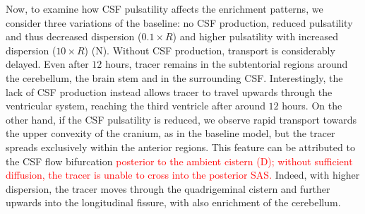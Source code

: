 \documentclass[fleqn,10pt]{wlscirep}
\newcommand{\discuss}[1]{\textcolor{red}{#1}}
\begin{document}
Now, to examine how CSF pulsatility affects the enrichment patterns,
we consider three variations of the baseline: no CSF production,
reduced pulsatility and thus decreased dispersion ($0.1 \times R$) and
higher pulsatility with increased dispersion ($10 \times R$)
(N). Without CSF production, transport is considerably
delayed. Even after $12$ hours, tracer remains in the subtentorial
regions around the cerebellum, the brain stem and in the surrounding
CSF. Interestingly, the lack of CSF production instead allows tracer
to travel upwards through the ventricular system, reaching the third
ventricle after around $12$ hours. On the other hand, if the CSF
pulsatility is reduced, we observe rapid transport towards the upper
convexity of the cranium, as in the baseline model, but the tracer
spreads exclusively within the anterior regions. This feature can be
attributed to the CSF flow bifurcation \discuss{posterior to the
  ambient cistern (D); without sufficient diffusion, the
  tracer is unable to cross into the posterior SAS.} Indeed, with
higher dispersion, the tracer moves through the quadrigeminal cistern
and further upwards into the longitudinal fissure, with also
enrichment of the cerebellum.


\end{document}
